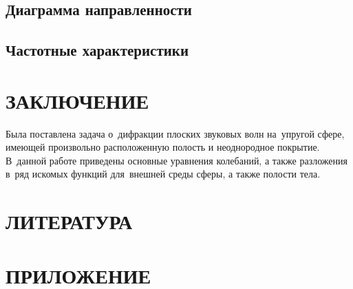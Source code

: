 \newpage
\subsection{Диаграмма направленности}

\newpage
\subsection{Частотные характеристики}


\newpage
\section*{ЗАКЛЮЧЕНИЕ}
Была поставлена задача о~дифракции плоских звуковых волн на~упругой сфере, имеющей произвольно расположенную полость и неоднородное покрытие. В~данной работе приведены основные уравнения колебаний, а также разложения в~ряд искомых функций для~внешней среды сферы, а также полости тела.

\newpage
\section*{ЛИТЕРАТУРА}

\newpage
\section*{ПРИЛОЖЕНИЕ}
